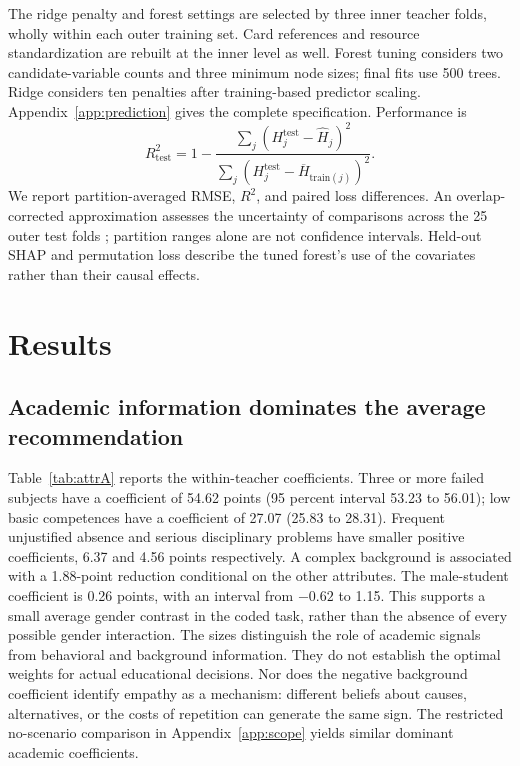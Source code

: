 \begin{addition}
The ridge penalty and forest settings are selected by three inner teacher folds, wholly within each outer training set. Card references and resource standardization are rebuilt at the inner level as well. Forest tuning considers two candidate-variable counts and three minimum node sizes; final fits use 500 trees. Ridge considers ten penalties after training-based predictor scaling. Appendix~\ref{app:prediction} gives the complete specification. Performance is
\[
R^2_{\mathrm{test}}=1-\frac{\sum_j(H_j^{\mathrm{test}}-\widehat H_j)^2}{\sum_j(H_j^{\mathrm{test}}-\overline H_{\mathrm{train}(j)})^2}.
\]
We report partition-averaged RMSE, $R^2$, and paired loss differences. An overlap-corrected approximation assesses the uncertainty of comparisons across the 25 outer test folds \cite{nadeau}; partition ranges alone are not confidence intervals. Held-out SHAP and permutation loss describe the tuned forest's use of the covariates rather than their causal effects.
\end{addition}

\section{Results}
\subsection{Academic information dominates the average recommendation}
Table~\ref{tab:attrA} reports the within-teacher coefficients. Three or more failed subjects have a coefficient of 54.62 points (95 percent interval 53.23 to 56.01); low basic competences have a coefficient of 27.07 (25.83 to 28.31). Frequent unjustified absence and serious disciplinary problems have smaller positive coefficients, 6.37 and 4.56 points respectively. A complex background is associated with a 1.88-point reduction conditional on the other attributes. The male-student coefficient is 0.26 points, with an interval from $-0.62$ to 1.15. This supports a small average gender contrast in the coded task, rather than the absence of every possible gender interaction.
The sizes distinguish the role of academic signals from behavioral and background information. They do not establish the optimal weights for actual educational decisions. Nor does the negative background coefficient identify empathy as a mechanism: different beliefs about causes, alternatives, or the costs of repetition can generate the same sign. The restricted no-scenario comparison in Appendix~\ref{app:scope} yields similar dominant academic coefficients.

